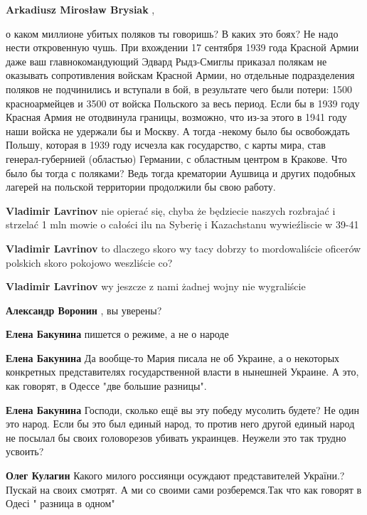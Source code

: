\begin{itemize}
\begin{itemize}
\textbf{Arkadiusz Mirosław Brysiak} , 

о каком миллионе убитых поляков ты говоришь? В каких это боях? Не надо нести
откровенную чушь. При вхождении 17 сентября 1939 года Красной Армии даже ваш
главнокомандующий Эдвард Рыдз-Смиглы приказал полякам не оказывать
сопротивления войскам Красной Армии, но отдельные подразделения поляков не
подчинились и вступали в бой, в результате чего были потери: 1500
красноармейцев и 3500 от войска Польского за весь период. Если бы в 1939 году
Красная Армия не отодвинула границы, возможно, что из-за этого в 1941 году наши
войска не удержали бы и Москву. А тогда -некому было бы освобождать Польшу,
которая в 1939 году исчезла как государство, с карты мира, став
генерал-губернией (областью) Германии, с областным центром в Кракове. Что было
бы тогда с поляками? Ведь тогда крематории Аушвица и других подобных лагерей на
польской территории продолжили бы свою работу.

\textbf{Vladimir Lavrinov} nie opierać się, chyba że będziecie naszych rozbrajać i strzelać 1 mln mowie o całości ilu na Syberię i Kazachstanu wywieźliscie w 39-41

\textbf{Vladimir Lavrinov} to dlaczego skoro wy tacy dobrzy to mordowaliście oficerów polskich skoro pokojowo weszliście co?

\textbf{Vladimir Lavrinov} wy jeszcze z nami żadnej wojny nie wygraliście

\textbf{Александр Воронин} , вы уверены?

\textbf{Елена Бакунина} пишется о режиме, а не о народе

\textbf{Елена Бакунина} Да вообще-то Мария писала не об Украине, а о некоторых конкретных представителях государственной власти в нынешней Украине. А это, как говорят, в Одессе "две большие разницы".

\textbf{Елена Бакунина} Господи, сколько ещё вы эту победу мусолить будете? Не один это народ. Если бы это был единый народ, то против него другой единый народ не посылал бы своих головорезов убивать украинцев. Неужели это так трудно усвоить?

\textbf{Олег Кулагин} Какого милого россиянци осуждают представителей України.? Пускай на своих смотрят. А ми со своими сами розберемся.Так что как говорят в Одесі " разница в одном"


\end{itemize}
\end{itemize}
